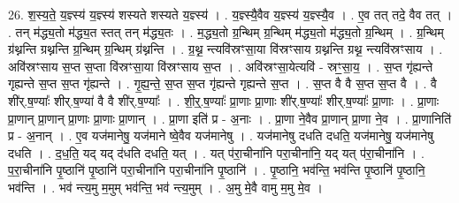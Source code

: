 \documentclass[17pt]{extarticle}
\begin{document}
26. श॒स्य॒ते॒ य॒ज्ञ्स्य॑ य॒ज्ञ्स्य॑ शस्यते शस्यते य॒ज्ञ्स्य॑ । . य॒ज्ञ्स्यै॒वैव य॒ज्ञ्स्य॑ य॒ज्ञ्स्यै॒व । . ए॒व तत् तदे॒ वैव तत् । . तन् म॑द्ध्य॒तो म॑द्ध्य॒त स्तत् तन् म॑द्ध्य॒तः । . म॒द्ध्य॒तो ग्र॒न्थिम् ग्र॒न्थिम् म॑द्ध्य॒तो म॑द्ध्य॒तो ग्र॒न्थिम् । . ग्र॒न्थिम् ग्र॑थ्नन्ति ग्रथ्नन्ति ग्र॒न्थिम् ग्र॒न्थिम् ग्र॑थ्नन्ति । . ग्र॒थ्न॒ न्त्यवि॑स्रꣳसा॒या वि॑स्रꣳसाय ग्रथ्नन्ति ग्रथ्न॒ न्त्यवि॑स्रꣳसाय । . अवि॑स्रꣳसाय स॒प्त स॒प्ता वि॑स्रꣳसा॒या वि॑स्रꣳसाय स॒प्त । . अवि॑स्रꣳसा॒येत्यवि॑ - स्रꣳ॒॒सा॒य॒ । . स॒प्त गृ॑ह्यन्ते गृह्यन्ते स॒प्त स॒प्त गृ॑ह्यन्ते । . गृ॒ह्य॒न्ते॒ स॒प्त स॒प्त गृ॑ह्यन्ते गृह्यन्ते स॒प्त । . स॒प्त वै वै स॒प्त स॒प्त वै । . वै शी॑र्.ष॒ण्याः᳚ शीर्.ष॒ण्या॑ वै वै शी॑र्.ष॒ण्याः᳚ । . शी॒र्॒.ष॒ण्याः᳚ प्रा॒णाः प्रा॒णाः शी॑र्.ष॒ण्याः᳚ शीर्.ष॒ण्याः᳚ प्रा॒णाः । . प्रा॒णाः प्रा॒णान् प्रा॒णान् प्रा॒णाः प्रा॒णाः प्रा॒णान् । . प्रा॒णा इति॑ प्र - अ॒नाः । . प्रा॒णा ने॒वैव प्रा॒णान् प्रा॒णा ने॒व । . प्रा॒णानिति॑ प्र - अ॒नान् । . ए॒व यज॑मानेषु॒ यज॑माने ष्वे॒वैव यज॑मानेषु । . यज॑मानेषु दधति दधति॒ यज॑मानेषु॒ यज॑मानेषु दधति । . द॒ध॒ति॒ यद् यद् द॑धति दधति॒ यत् । . यत् प॑रा॒चीना॑नि परा॒चीना॑नि॒ यद् यत् प॑रा॒चीना॑नि । . प॒रा॒चीना॑नि पृ॒ष्ठानि॑ पृ॒ष्ठानि॑ परा॒चीना॑नि परा॒चीना॑नि पृ॒ष्ठानि॑ । . पृ॒ष्ठानि॒ भव॑न्ति॒ भव॑न्ति पृ॒ष्ठानि॑ पृ॒ष्ठानि॒ भव॑न्ति । . भव॑ न्त्य॒मु म॒मुम् भव॑न्ति॒ भव॑ न्त्य॒मुम् । . अ॒मु मे॒वै वामु म॒मु मे॒व । \newline
\end{document}
